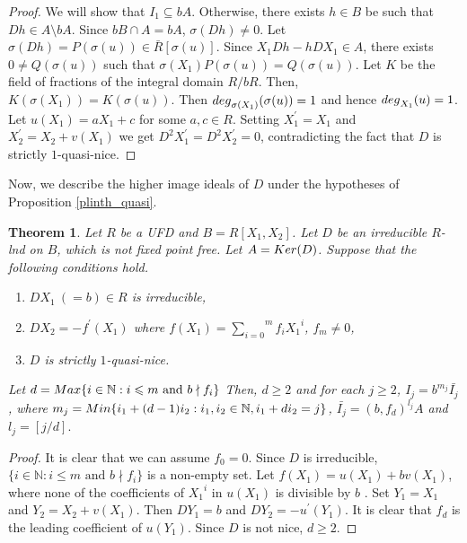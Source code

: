 \documentclass[a4paper,12pt]{article}
\newtheorem{thm}{Theorem}[section]
\newcommand{\bN}{\mathbb N}
\begin{document}
{\begin{proof}
\smallskip
\noindent We will show that $I_1 \subseteq bA$. Otherwise, there exists $h\in{B}$ be such that $Dh\in{A\setminus bA}$. Since $bB\cap A=bA$, $\sigma(Dh)\neq 0$. Let $\sigma(Dh)=P(\sigma(u))\in{\bar{R}[\sigma(u)]}$. Since $X_1Dh-hDX_1\in{A}$, there exists $0\neq Q(\sigma(u))$ such that $\sigma(X_1)P(\sigma(u))=Q(\sigma(u))$. Let $K$ be the field of fractions of the integral domain $R/bR$. Then, $K(\sigma(X_1))=K(\sigma(u))$. Then ${\rm deg}_{\sigma(X_1)}(\sigma(u))=1$ and hence ${\rm deg}_{X_1}(u)=1$. Let $u(X_1)=aX_1+c$ for some $a,c\in R$. Setting  $X_1^\prime=X_1$ and $X_2^\prime=X_2+v(X_1)$ we get $D^2X_1^\prime=D^2X_2^\prime=0$, contradicting the fact that $D$ is strictly $1$-quasi-nice.
\end{proof}

Now, we describe the higher image ideals of $D$ under the hypotheses of Proposition \ref{plinth_quasi}.
\begin{thm}\label{2varquasi}
Let $R$ be a {\rm UFD} and $B=R[X_1,X_2]$. Let $D$ be an irreducible $R$-lnd on $B$, which is not fixed point free. Let $A={\rm Ker}(D)$. Suppose that the following conditions hold.
\begin{enumerate}
	\item[\rm(i)]$DX_1~(=b)\in R$ is irreducible,
	\item[\rm(ii)]$DX_2=-f^{\prime}(X_1)$ where $f(X_1)=\overset{m}{\underset{i=0}{\sum}} f_i{X_1}^i$, $f_m\neq 0$,
	\item[\rm(iii)]$D$ is strictly $1$-quasi-nice. 
\end{enumerate}
Let $d={\rm Max}\{i\in\bN:i\leqslant m \text{ and } b\nmid f_i\}$
Then, $d\geqslant 2$ and for each $j\geqslant 2$, $I_j=b^{m_j}\bar{I_j}$, where $m_j={\rm Min}\{i_1+(d-1)i_2:i_1,i_2\in\bN,i_1+di_2=j\}$, $\bar{I_j}={(b,f_d)}^{l_j}A$ and $l_j=[j/d].$

\end{thm}
\begin{proof}

\noindent
It is clear that we can assume $f_0=0$. Since $D$ is irreducible, $\{i\in\bN:i\leqslant m \text{ and } b\nmid f_i\}$ is a non-empty set. Let $f(X_1)=u(X_1)+bv(X_1)$, where none of the coefficients of ${X_1}^i$ in $u(X_1)$ is divisible by $b$ . Set $Y_1=X_1$ and $Y_2=X_2+v(X_1)$. Then $DY_1=b$ and $DY_2=-u^{\prime}(Y_1)$. It is clear that $f_d$ is the leading coefficient of $u(Y_1)$. Since $D$ is not nice, $d\geqslant 2$.




\end{proof}}
\end{document}
